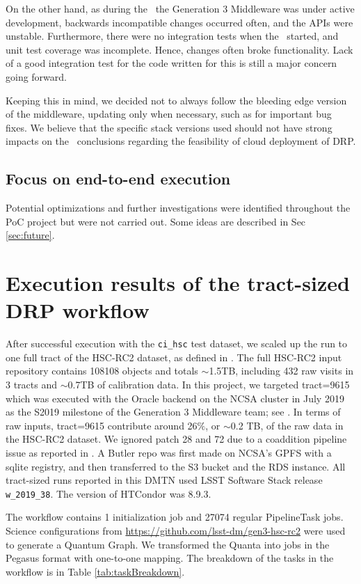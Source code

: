 On the other hand, as during the \poc~the Generation 3 Middleware was under active development, backwards incompatible changes occurred often, and the APIs were unstable.
Furthermore, there were no integration tests when the \poc~started, and unit test coverage was incomplete.
Hence, changes often broke functionality.
Lack of a good integration test for the code written for this \poc is still a major concern going forward.

Keeping this in mind, we decided not to always follow the bleeding edge version of the middleware, updating only when necessary, such as for important bug fixes.
We believe that the specific stack versions used should not have strong impacts on the \poc~conclusions regarding the feasibility of cloud deployment of DRP.

\subsection{Focus on end-to-end execution}

Potential optimizations and further investigations were identified throughout the PoC project but were not carried out.
Some ideas are described in Sec \ref{sec:future}.


\section{Execution results of the tract-sized DRP workflow}
\label{sec:results}

After successful execution with the \texttt{ci\_hsc} test dataset, we scaled up the run to one full tract of the HSC-RC2 dataset, as defined in .
The full HSC-RC2 input repository contains 108108 objects and totals $\sim$1.5TB, including 432 raw visits in 3 tracts and $\sim$0.7TB of calibration data.
In this project, we targeted tract=9615 which was executed with the Oracle backend on the NCSA cluster in July 2019 as the S2019 milestone of the Generation 3 Middleware team; see .
In terms of raw inputs, tract=9615 contribute around 26$\%$, or $\sim$0.2 TB, of the raw data in the HSC-RC2 dataset.
We ignored patch 28 and 72 due to a coaddition pipeline issue as reported in .
A Butler repo was first made on NCSA's GPFS with a sqlite registry, and then transferred to the S3 bucket and the RDS instance.
All tract-sized runs reported in this DMTN used LSST Software Stack release \texttt{w\_2019\_38}.
The version of HTCondor was 8.9.3.

The workflow contains 1 initialization job and 27074 regular PipelineTask jobs.
Science configurations from \url{https://github.com/lsst-dm/gen3-hsc-rc2} were used to generate a Quantum Graph.
We transformed the Quanta into jobs in the Pegasus format with one-to-one mapping.
The breakdown of the tasks in the workflow is in Table \ref{tab:taskBreakdown}.

